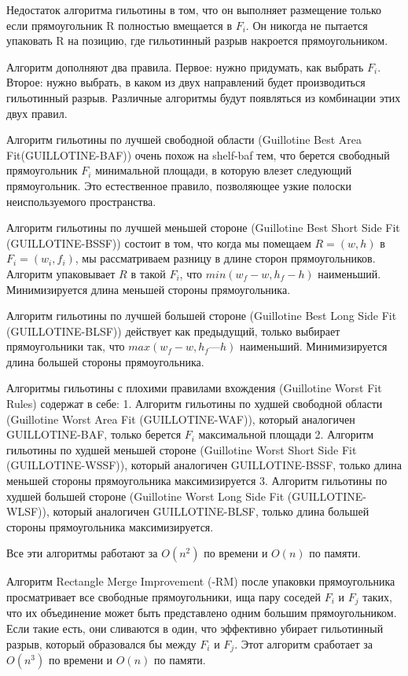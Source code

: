 \documentclass[a4paper,12pt]{report}
\begin{document}
Недостаток алгоритма гильотины в том, что он выполняет размещение только если прямоугольник R полностью вмещается в $F_i$. Он никогда не пытается упаковать R на позицию, где гильотинный разрыв накроется прямоугольником.

Алгоритм дополняют два правила. Первое: нужно придумать, как выбрать $F_i$. Второе: нужно выбрать, в каком из двух направлений будет производиться гильотинный разрыв. Различные алгоритмы будут появляться из комбинации этих двух правил.

Алгоритм гильотины по лучшей свободной области (Guillotine Best Area Fit\newline (GUILLOTINE-BAF)) очень похож на shelf-baf тем, что берется свободный прямоугольник $F_i$ минимальной площади, в которую влезет следующий прямоугольник. Это естественное правило, позволяющее узкие полоски неиспользуемого пространства.

Алгоритм гильотины по лучшей меньшей стороне (Guillotine Best Short Side Fit (GUILLOTINE-BSSF)) состоит в том, что когда мы помещаем $R = (w, h)$ в $F_i = (w_i, f_i)$, мы рассматриваем разницу в длине сторон прямоугольников. Алгоритм упаковывает $R$ в такой $F_i$, что $min(w_f - w, h_f - h)$ наименьший. Минимизируется длина меньшей стороны прямоугольника.

Алгоритм гильотины по лучшей большей стороне (Guillotine Best Long Side Fit (GUILLOTINE-BLSF)) действует как предыдущий, только выбирает прямоугольники так, что $max(w_f - w, h_f — h)$ наименьший. Минимизируется длина большей стороны прямоугольника.

Алгоритмы гильотины с плохими правилами вхождения (Guillotine Worst Fit Rules) содержат в себе:
1. Алгоритм гильотины по худшей свободной области (Guillotine Worst Area Fit (GUILLOTINE-WAF)), который аналогичен GUILLOTINE-BAF, только берется $F_i$ максимальной площади
2. Алгоритм гильотины по худшей меньшей стороне (Guillotine Worst Short Side Fit (GUILLOTINE-WSSF)), который аналогичен GUILLOTINE-BSSF, только длина меньшей стороны прямоугольника  максимизируется
3. Алгоритм гильотины по худшей большей стороне (Guillotine Worst Long Side Fit (GUILLOTINE-WLSF)), который аналогичен GUILLOTINE-BLSF, только длина большей стороны прямоугольника максимизируется.

Все эти алгоритмы работают за $O(n^2)$ по времени и $O(n)$ по памяти.

Алгоритм Rectangle Merge Improvement (-RM) после упаковки прямоугольника просматривает все свободные прямоугольники, ища пару соседей $F_i$ и $F_j$ таких, что их объединение может быть представлено одним большим прямоугольником. Если такие есть, они сливаются в один, что эффективно убирает гильотинный разрыв, который образовался бы между $F_i$ и $F_j$. Этот алгоритм сработает за $O(n^3)$ по времени и $O(n)$ по памяти. 
\end{document}
